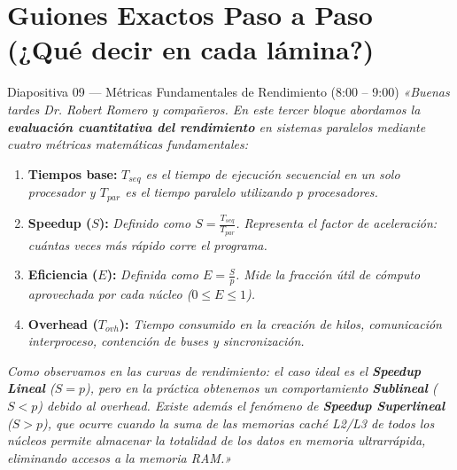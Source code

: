 \documentclass[11pt,a4paper]{article}
\begin{document}
\section{Guiones Exactos Paso a Paso (¿Qué decir en cada lámina?)}

\begin{guionbox}{Diapositiva 09 --- Métricas Fundamentales de Rendimiento (8:00 -- 9:00)}
\textit{«Buenas tardes Dr. Robert Romero y compañeros. En este tercer bloque abordamos la \textbf{evaluación cuantitativa del rendimiento} en sistemas paralelos mediante cuatro métricas matemáticas fundamentales:}

\begin{enumerate}[leftmargin=5mm]
    \item \textbf{Tiempos base:} \textit{$T_{seq}$ es el tiempo de ejecución secuencial en un solo procesador y $T_{par}$ es el tiempo paralelo utilizando $p$ procesadores.}
    \item \textbf{Speedup ($S$):} \textit{Definido como $S = \frac{T_{seq}}{T_{par}}$. Representa el factor de aceleración: cuántas veces más rápido corre el programa.}
    \item \textbf{Eficiencia ($E$):} \textit{Definida como $E = \frac{S}{p}$. Mide la fracción útil de cómputo aprovechada por cada núcleo ($0 \le E \le 1$).}
    \item \textbf{Overhead ($T_{ovh}$):} \textit{Tiempo consumido en la creación de hilos, comunicación interproceso, contención de buses y sincronización.}
\end{enumerate}

\textit{Como observamos en las curvas de rendimiento: el caso ideal es el \textbf{Speedup Lineal} ($S = p$), pero en la práctica obtenemos un comportamiento \textbf{Sublineal} ($S < p$) debido al overhead. Existe además el fenómeno de \textbf{Speedup Superlineal} ($S > p$), que ocurre cuando la suma de las memorias caché L2/L3 de todos los núcleos permite almacenar la totalidad de los datos en memoria ultrarrápida, eliminando accesos a la memoria RAM.»}
\end{guionbox}
\end{document}
